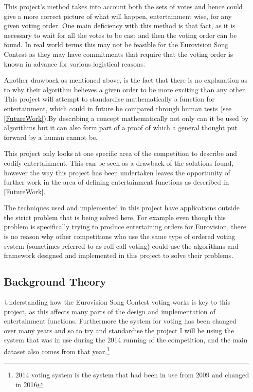 \documentclass[12pt]{report}
\begin{document}
This project's method takes into account both the sets of votes and hence could give a more correct picture of what will happen, entertainment wise, for any given voting order. One main deficiency with this method is that fact, as it is necessary to wait for all the votes to be cast and then the voting order can be found. In real world terms this may not be feasible for the Eurovision Song Contest as they may have commitments that require that the voting order is known in advance for various logistical reasons.

Another drawback as mentioned above, is the fact that there is no explanation as to why their algorithm believes a given order to be more exciting than any other. This project will attempt to standardise mathematically a function for entertainment, which could in future be compared through human tests (see \ref{FutureWork}).By describing a concept mathematically not only can it be used by algorithms but it can also form part of a proof of which a general thought put forward by a human cannot be.

This project only looks at one specific area of the competition to describe and codify entertainment. This can be seen as a drawback of the solutions found, however the way this project has been undertaken leaves the opportunity of further work in the area of defining entertainment functions as described in \ref{FutureWork}.

The techniques used and implemented in this project have applications outside the strict problem that is being solved here. For example even though this problem is specifically trying to produce entertaining orders for Eurovision, there is no reason why other competitions who use the same type of ordered voting system (sometimes referred to as roll-call voting) could use the algorithms and framework designed and implemented in this project to solve their problems. 

\subsection{Background Theory}\label{BackgroundTheory}
Understanding how the Eurovision Song Contest voting works is key to this project, as this affects many parts of the design and implementation of entertainment functions. Furthermore the system for voting has been changed over many years and so to try and standardise the project I will be using the system that was in use during the 2014 running of the competition, and the main dataset also comes from that year.\footnote{2014 voting system is the system that had been in use from 2009 and changed in 2016}
\end{document}
